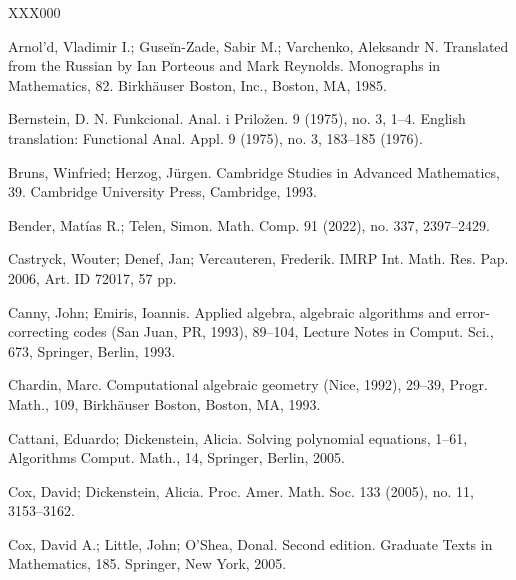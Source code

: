 \documentclass[a4paper,11pt]{amsart}
\newcounter{thm}
\numberwithin{thm}{section}
\numberwithin{equation}{section}
\theoremstyle{definition}
\theoremstyle{plain}
\begin{document}
\bigskip
\begin{thebibliography}{XXX000}

Arnol'd, Vladimir I.; Guse\u{i}n-Zade, Sabir M.; Varchenko, Aleksandr N.
\newblock Translated from the Russian by Ian Porteous and Mark Reynolds. Monographs in Mathematics, 82. Birkh\"auser Boston, Inc., Boston, MA, 1985.

Bernstein, D. N.
\newblock Funkcional. Anal. i Prilo\v{z}en. 9 (1975), no. 3, 1--4.  English translation: Functional Anal. Appl. 9 (1975), no. 3, 183--185 (1976).

Bruns, Winfried; Herzog, J\"urgen.
\newblock Cambridge Studies in Advanced Mathematics, 39. Cambridge University Press, Cambridge, 1993.


Bender, Mat\'ias R.; Telen, Simon.
Math. Comp. 91 (2022), no. 337, 2397--2429.

Castryck, Wouter; Denef, Jan; Vercauteren, Frederik.
\newblock IMRP Int. Math. Res. Pap. 2006, Art. ID 72017, 57 pp.

Canny, John; Emiris, Ioannis.
\newblock Applied algebra, algebraic algorithms and error-correcting codes (San Juan, PR, 1993), 89--104, Lecture Notes in Comput. Sci., 673, Springer, Berlin, 1993.

Chardin, Marc.
Computational algebraic geometry (Nice, 1992), 29--39, Progr. Math., 109, Birkh\"auser Boston, Boston, MA, 1993.

Cattani, Eduardo; Dickenstein, Alicia.
  Solving polynomial equations, 1--61, 
\newblock Algorithms Comput. Math., 14, Springer, Berlin, 2005.

Cox, David; Dickenstein, Alicia.
 Proc. Amer. Math. Soc. 133 (2005), no. 11, 3153--3162.

Cox, David A.; Little, John; O'Shea, Donal.
 Second edition.
\newblock Graduate Texts in Mathematics, 185. Springer, New York, 2005.


\end{thebibliography}
\end{document}
